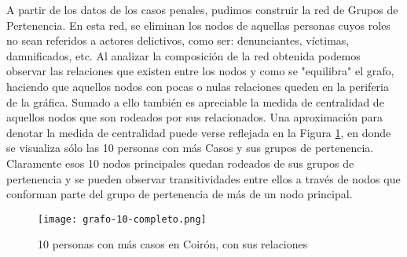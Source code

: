 A partir de los datos de los casos penales, pudimos construir la red de Grupos de Pertenencia. En esta red, se eliminan los nodos de aquellas personas cuyos roles no sean referidos a actores delictivos, como ser: denunciantes, víctimas, damnificados, etc. 
Al analizar la composición de la red obtenida podemos observar las relaciones que existen entre los nodos y como se "equilibra" el grafo, haciendo que aquellos nodos con pocas o nulas relaciones queden en la periferia de la gráfica. Sumado a ello también es apreciable la medida de centralidad de aquellos nodos que son rodeados por sus relacionados. Una aproximación para denotar la medida de centralidad puede verse reflejada en la Figura \ref{fig:grafoTop10}, en donde se visualiza sólo las 10 personas con más Casos y sus grupos de pertenencia. Claramente esos 10 nodos principales quedan rodeados de sus grupos de pertenencia y se pueden observar transitividades entre ellos a través de nodos que conforman parte del grupo de pertenencia de más de un nodo principal.
\vspace{-15pt}
\begin{figure}
	\centering
	\texttt{[image: grafo-10-completo.png]}
	\caption{10 personas con más casos en Coirón, con sus relaciones} 
	\label{fig:grafoTop10}
\end{figure}
\vspace{-15pt}